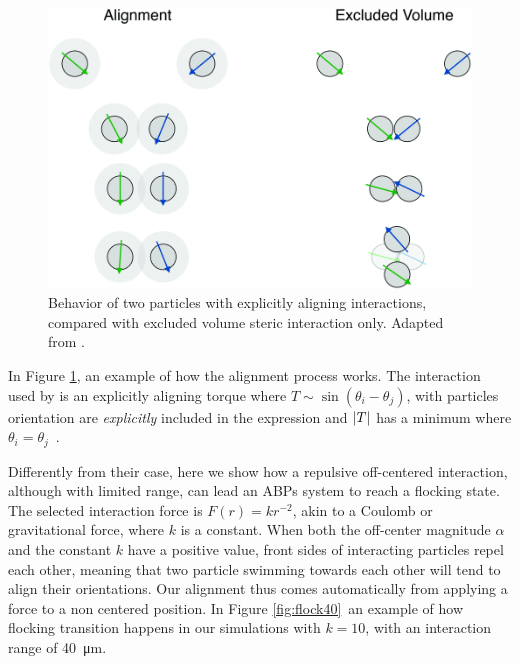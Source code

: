 \documentclass[../../master_thesis_np.tex]{subfiles}
\begin{document}
		\begin{figure}[htp]
			\centering
			\includegraphics[width=\textwidth]{alignment.png}
			\caption{Behavior of two particles with explicitly aligning interactions, compared with excluded volume steric interaction only. Adapted from \cite{martin-gomez_collective_2018}.}
			\label{fig:alignment}
		\end{figure}
		
		In Figure \ref{fig:alignment}, an example of how the alignment process works. 
		The interaction used by \citeauthor{martin-gomez_collective_2018} is an explicitly aligning torque where $T \sim \sin( \theta_{i}-\theta_{j} )$, with particles orientation are \emph{explicitly} included in the expression and $\abs{T}$ has a minimum where $\theta_{i} = \theta_{j}$~\cite{martin-gomez_collective_2018}. 
		
		Differently from their case, here we show how a repulsive off-centered interaction, although with limited range, can lead an ABPs system to reach a flocking state. 
		The selected interaction force is $F(r) = kr^{-2}$, akin to a Coulomb or gravitational force, where $k$ is a constant. 
		When both the off-center magnitude $\alpha$ and the constant $k$ have a positive value, front sides of interacting particles repel each other, meaning that two particle swimming towards each other will tend to align their orientations. 
		Our alignment thus comes automatically from applying a force to a non centered position. 
		In Figure \ref{fig:flock40}\, an example of how flocking transition happens in our simulations with $k = 10$, with an interaction range of \SI{40}{\micro\meter}.
\end{document}
